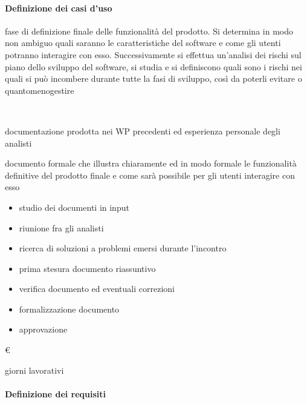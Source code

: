 \paragraph{Definizione dei casi d'uso}
\item[Descrizione:]fase di definizione finale delle funzionalità del prodotto. Si determina
in modo non ambiguo quali saranno le caratteristiche del software e come gli utenti
potranno interagire con esso. Successivamente si effettua un’analisi dei rischi sul piano dello sviluppo
del software, si studia e si definiscono quali sono i rischi nei quali si
può incombere durante tutte la fasi di sviluppo, così da poterli evitare o quantomenogestire\\

\item[Responsabile:] \\

\item[Input: ]documentazione prodotta nei WP precedenti ed esperienza personale degli
analisti\\

\item[Output:] documento formale che illustra chiaramente ed in modo formale le funzionalità
definitive del prodotto finale e come sarà possibile per gli utenti interagire con esso\\

\item[Attività:]
\begin{itemize}
\item studio dei documenti in input
\item riunione fra gli analisti
\item ricerca di soluzioni a problemi emersi durante l’incontro
\item prima stesura documento riassuntivo
\item verifica documento ed eventuali correzioni
\item formalizzazione documento
\item approvazione
\end{itemize}

\item[Costo:] \euro \\
\item[Tempi di realizzazione:]  giorni lavorativi



\paragraph{Definizione dei requisiti}


